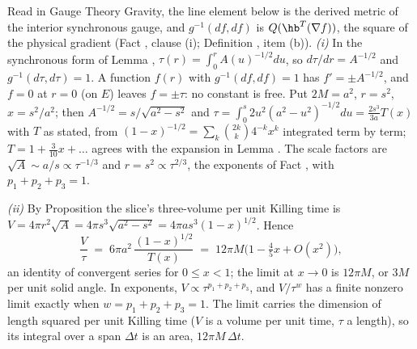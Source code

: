 Read in Gauge Theory Gravity, the line element below is the derived metric of the interior synchronous gauge, and $g^{-1}(df, df)$ is $Q(\hb^{T}(\nabla f))$, the square of the physical gradient (Fact , clause (i); Definition , item (b)). \emph{(i)} In the synchronous form of Lemma , $\tau(r) = \int_{0}^{r}A(u)^{-1/2}du$, so $d\tau/dr = A^{-1/2}$ and $g^{-1}(d\tau, d\tau) = 1$. A function $f(r)$ with $g^{-1}(df, df) = 1$ has $f' = \pm A^{-1/2}$, and $f = 0$ at $r = 0$ (on $E$) leaves $f = \pm\tau$: no constant is free. Put $2M = a^{2}$, $r = s^{2}$, $x = s^{2}/a^{2}$; then $A^{-1/2} = s/\sqrt{a^{2} - s^{2}}$ and $\tau = \int_{0}^{s} 2u^{2}(a^{2} - u^{2})^{-1/2}du = \tfrac{2s^{3}}{3a}T(x)$ with $T$ as stated, from $(1 - x)^{-1/2} = \sum_{k}\binom{2k}{k}4^{-k}x^{k}$ integrated term by term; $T = 1 + \tfrac3{10}x + \dots$ agrees with the expansion in Lemma . The scale factors are $\sqrt{A} \sim a/s \propto \tau^{-1/3}$ and $r = s^{2} \propto \tau^{2/3}$, the exponents of Fact , with $p_{1}+p_{2}+p_{3} = 1$.

\emph{(ii)} By Proposition  the slice's three-volume per unit Killing time is $V = 4\pi r^{2}\sqrt{A} = 4\pi s^{3}\sqrt{a^{2} - s^{2}} = 4\pi a s^{3}(1-x)^{1/2}$. Hence
\[
\frac{V}{\tau} \;=\; 6\pi a^{2}\,\frac{(1-x)^{1/2}}{T(x)} \;=\; 12\pi M\bigl(1 - \tfrac45 x + O(x^{2})\bigr),
\]
an identity of convergent series for $0 \le x < 1$; the limit at $x \to 0$ is $12\pi M$, or $3M$ per unit solid angle. In exponents, $V \propto \tau^{p_{1}+p_{2}+p_{3}}$, and $V/\tau^{w}$ has a finite nonzero limit exactly when $w = p_{1}+p_{2}+p_{3} = 1$. The limit carries the dimension of length squared per unit Killing time ($V$ is a volume per unit time, $\tau$ a length), so its integral over a span $\Delta t$ is an area, $12\pi M\,\Delta t$.

